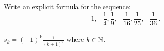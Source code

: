 \guard



\begin{exmp}
\label{exmp:findExplicitFormulaOfSequence}
  Write an explicit formula for the sequence: \[ 1,-\frac{1}{4},\frac{1}{9},-\frac{1}{16},\frac{1}{25},-\frac{1}{36}\,.\]\\
  $s_k = (-1)^{k}\frac{1}{(k+1)^2}$ where $k\in\mathbb{N}$.
\end{exmp}

